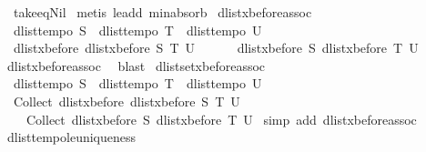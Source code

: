 \begin{isabellebody}
\ \ take{\isacharunderscore}eq{\isacharunderscore}Nil{\isacharparenright}\isanewline
{}\isamarkupfalse%
\ {\isacharparenleft}metis\ le{\isacharunderscore}add{}\ min{\isachardot}absorb{}{\isacharparenright}%
\endisatagproof
{\isafoldproof}%
%
\isadelimproof
\isanewline
%
\endisadelimproof
\isanewline
{}\isamarkupfalse%
\ dlist{\isacharunderscore}xbefore{\isacharunderscore}assoc{\isacharcolon}\isanewline
\ \ {\isachardoublequoteopen}dlist{\isacharunderscore}tempo{}\ S\ {\isasymLongrightarrow}\ dlist{\isacharunderscore}tempo{}\ T\ {\isasymLongrightarrow}\ dlist{\isacharunderscore}tempo{}\ U\ {\isasymLongrightarrow}\ \isanewline
\ \ {\isacharparenleft}dlist{\isacharunderscore}xbefore\ {\isacharparenleft}dlist{\isacharunderscore}xbefore\ S\ T{\isacharparenright}\ U{\isacharparenright}\ {\isacharequal}\ \isanewline
\ \ \ \ {\isacharparenleft}dlist{\isacharunderscore}xbefore\ S\ {\isacharparenleft}dlist{\isacharunderscore}xbefore\ T\ U{\isacharparenright}{\isacharparenright}{\isachardoublequoteclose}\isanewline
%
\isadelimproof
%
\endisadelimproof
%
\isatagproof
{}\isamarkupfalse%
\ dlist{\isacharunderscore}xbefore{\isacharunderscore}assoc{}\ \isamarkupfalse%
\ blast%
\endisatagproof
{\isafoldproof}%
%
\isadelimproof
\isanewline
%
\endisadelimproof
\isanewline
{}\isamarkupfalse%
\ dlistset{\isacharunderscore}xbefore{\isacharunderscore}assoc{\isacharcolon}\isanewline
\ \ {\isachardoublequoteopen}dlist{\isacharunderscore}tempo{}\ S\ {\isasymLongrightarrow}\ dlist{\isacharunderscore}tempo{}\ T\ {\isasymLongrightarrow}\ dlist{\isacharunderscore}tempo{}\ U\ {\isasymLongrightarrow}\isanewline
\ \ Collect\ {\isacharparenleft}dlist{\isacharunderscore}xbefore\ {\isacharparenleft}dlist{\isacharunderscore}xbefore\ S\ T{\isacharparenright}\ U{\isacharparenright}\ {\isacharequal}\ \isanewline
\ \ \ \ Collect\ {\isacharparenleft}dlist{\isacharunderscore}xbefore\ S\ {\isacharparenleft}dlist{\isacharunderscore}xbefore\ T\ U{\isacharparenright}{\isacharparenright}{\isachardoublequoteclose}\isanewline
%
\isadelimproof
%
\endisadelimproof
%
\isatagproof
{}\isamarkupfalse%
\ {\isacharparenleft}simp\ add{\isacharcolon}\ dlist{\isacharunderscore}xbefore{\isacharunderscore}assoc{\isacharparenright}%
\endisatagproof
{\isafoldproof}%
%
\isadelimproof
%
\endisadelimproof
%
\isamarkuptrue%
\isamarkupfalse%
\ dlist{\isacharunderscore}tempo{}{\isacharunderscore}le{\isacharunderscore}uniqueness{\isacharcolon}\ \isanewline

\end{isabellebody}
